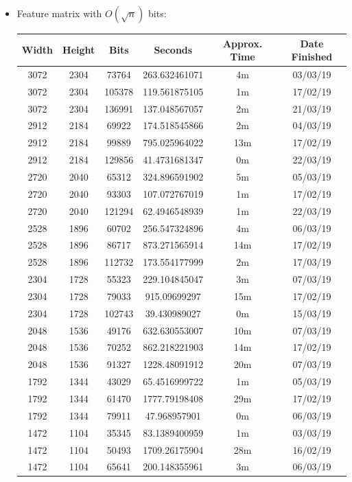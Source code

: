 \documentclass[11pt,a4paper]{report}
\begin{document}
\begin{itemize}
\newpage
\item Feature matrix with $O(\sqrt{n})$ bits:
  \begin{center}
  \begin{tabular}{ c c c | c c c }
  Width & Height & Bits & Seconds & Approx. Time & Date Finished \\ \hline
  3072 & 2304 & 73764 & 263.632461071 & 4m & 03/03/19 \\
  3072 & 2304 & 105378 & 119.561875105 & 1m & 17/02/19 \\
  3072 & 2304 & 136991 & 137.048567057 & 2m & 21/03/19 \\
  2912 & 2184 & 69922 & 174.518545866 & 2m & 04/03/19 \\
  2912 & 2184 & 99889 & 795.025964022 & 13m & 17/02/19 \\
  2912 & 2184 & 129856 & 41.4731681347 & 0m & 22/03/19 \\
  2720 & 2040 & 65312 & 324.896591902 & 5m & 05/03/19 \\
  2720 & 2040 & 93303 & 107.072767019 & 1m & 17/02/19 \\
  2720 & 2040 & 121294 & 62.4946548939 & 1m & 22/03/19 \\
  2528 & 1896 & 60702 & 256.547324896 & 4m & 06/03/19 \\
  2528 & 1896 & 86717 & 873.271565914 & 14m & 17/02/19 \\
  2528 & 1896 & 112732 & 173.554177999 & 2m & 17/03/19 \\
  2304 & 1728 & 55323 & 229.104845047 & 3m & 07/03/19 \\
  2304 & 1728 & 79033 & 915.09699297 & 15m & 17/02/19 \\
  2304 & 1728 & 102743 & 39.430989027 & 0m & 15/03/19 \\
  2048 & 1536 & 49176 & 632.630553007 & 10m & 07/03/19 \\
  2048 & 1536 & 70252 & 862.218221903 & 14m & 17/02/19 \\
  2048 & 1536 & 91327 & 1228.48091912 & 20m & 07/03/19 \\
  1792 & 1344 & 43029 & 65.4516999722 & 1m & 05/03/19 \\
  1792 & 1344 & 61470 & 1777.79198408 & 29m & 17/02/19 \\
  1792 & 1344 & 79911 & 47.968957901 & 0m & 06/03/19 \\
  1472 & 1104 & 35345 & 83.1389400959 & 1m & 03/03/19 \\
  1472 & 1104 & 50493 & 1709.26175904 & 28m & 16/02/19 \\
  1472 & 1104 & 65641 & 200.148355961 & 3m & 06/03/19 \\

\end{tabular}
\end{center}
\end{itemize}
\end{document}
